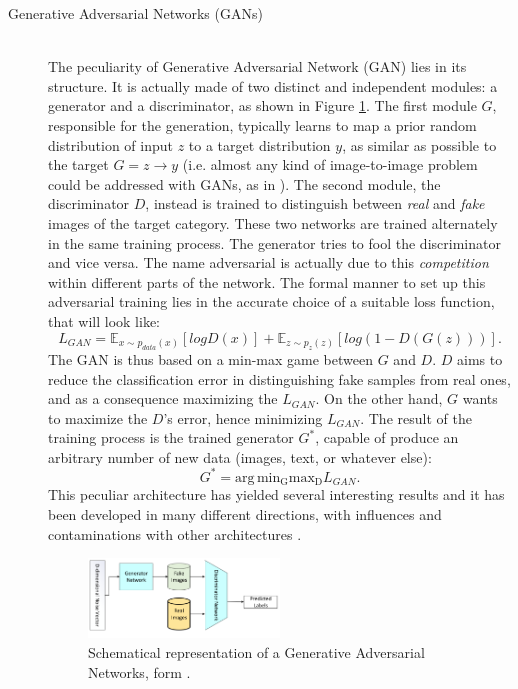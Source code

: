\begin{description}
    \item [Generative Adversarial Networks (GANs)] \hfill \\
        The peculiarity of Generative Adversarial Network (GAN) lies in its structure. It is actually made of two distinct and independent modules: a generator and a discriminator, as shown in Figure \ref{fig:GAN}. The first module $G$, responsible for the generation, typically learns to map a prior random distribution of input $z$ to a target distribution $y$, as similar as possible to the target $G = z \rightarrow y$ (i.e. almost any kind of image-to-image problem could be addressed with GANs, as in \cite{1611.07004}). The second module, the discriminator $D$, instead is trained to distinguish between \textit{real} and \textit{fake} images of the target category. These two networks are trained alternately in the same training process. The generator tries to fool the discriminator and vice versa. The name adversarial is actually due to this \textit{competition} within different parts of the network. The formal manner to set up this adversarial training lies in the accurate choice of a suitable loss function, that will look like: $$L_{GAN} = \mathbb{E}_{x \sim p_{data}(x)}[logD(x)] + \mathbb{E}_{z \sim p_{z}(z)}[log(1-D(G(z)))].$$
        The GAN is thus based on a min-max game between $G$ and $D$. $D$ aims to reduce the classification error in distinguishing fake samples from real ones, and as a consequence maximizing the $L_{GAN}$. On the other hand, $G$ wants to maximize the $D$'s error, hence minimizing $L_{GAN}$. The result of the training process is the trained generator $G^*$, capable of produce an arbitrary number of new data (images, text, or whatever else): $$ G^* = \operatorname*{arg\,min_Gmax_D} L_{GAN}.$$
        This peculiar architecture has yielded several interesting results and it has been developed in many different directions, with influences and contaminations with other architectures \cite{1611.07004}.

        \begin{figure}
            \centering
            \includegraphics[width = 0.5\textwidth]{images/GAN}
            \caption{Schematical representation of a Generative Adversarial Networks, form \cite{deep_seg_SOA}.}
            \label{fig:GAN}
        \end{figure}


\end{description}
